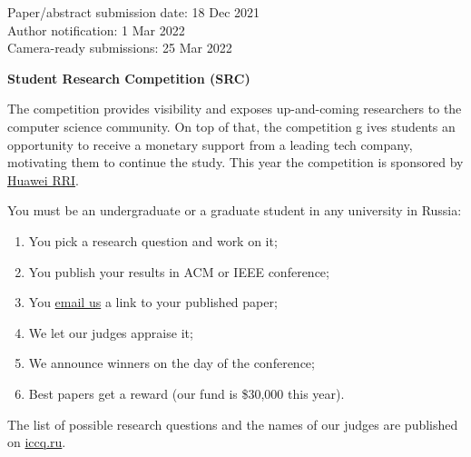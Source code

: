 \documentclass{../cfp}
\begin{document}
\vspace{6pt}

Paper/abstract submission date: 18 Dec 2021 \\
Author notification: 1 Mar 2022 \\
Camera-ready submissions: 25 Mar 2022


\newpage

{\color{xred}\bfseries{\Large Student Research Competition (SRC)}}

The competition provides visibility and exposes up-and-coming
researchers to the computer science community. On top of that, the competition g
ives students an opportunity to receive a monetary support from a leading tech
company, motivating them to continue the study.
This year the competition is sponsored by \href{https://career.huawei.ru/rri/}{Huawei RRI}.

You must be an undergraduate or a graduate student in any university in Russia:

\begin{enumerate}
\item You pick a research question and work on it;
\item You publish your results in ACM or IEEE conference;
\item You \href{mailto:src@iccq.ru}{email us} a link to your published paper;
\item We let our judges appraise it;
\item We announce winners on the day of the conference;
\item Best papers get a reward (our fund is \$30,000 this year).
\end{enumerate}

The list of possible research questions and the names of our judges are published
on \href{https://www.iccq.ru}{iccq.ru}.
\end{document}
